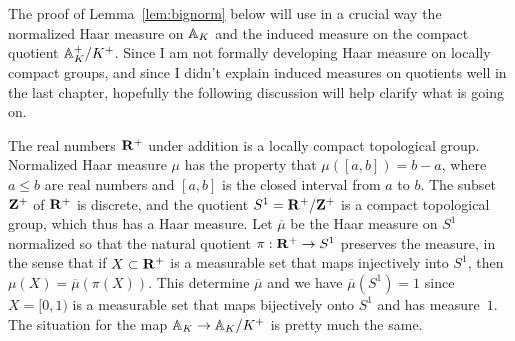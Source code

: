 The proof of Lemma~\ref{lem:bignorm} below will use in a crucial way
the normalized Haar measure on $\AA_K$ and the induced measure on the
compact quotient $\AA_K^+/K^+$.  Since I am not formally developing
Haar measure on locally compact groups, and since I didn't explain
induced measures on quotients well in the last chapter, hopefully the
following discussion will help clarify what is going on.

The real numbers $\R^+$ under addition is a locally compact
topological group.  Normalized Haar measure $\mu$ has the property
that $\mu([a,b]) = b-a$, where $a\leq b$ are real numbers and 
$[a,b]$ is the closed interval from $a$ to $b$.  The subset
$\Z^+$ of $\R^+$ is discrete, and the quotient $S^1 = \R^+/\Z^+$
is a compact topological group, which thus
has a Haar measure.  Let $\overline{\mu}$ be the Haar measure 
on $S^1$ normalized so that  the natural quotient $\pi:\R^+\to S^1$
preserves the measure, in the sense that if $X\subset \R^+$
is a measurable set that maps injectively into $S^1$, then 
$\mu(X) = \overline{\mu}(\pi(X))$.  This determine
$\overline{\mu}$ and we have $\overline{\mu}(S^1)=1$ since 
$X=[0,1)$ is a measurable set that maps bijectively onto
$S^1$ and has measure~$1$.  The situation for the map
$\AA_K \to \AA_K/K^+$ is pretty much the same.  


